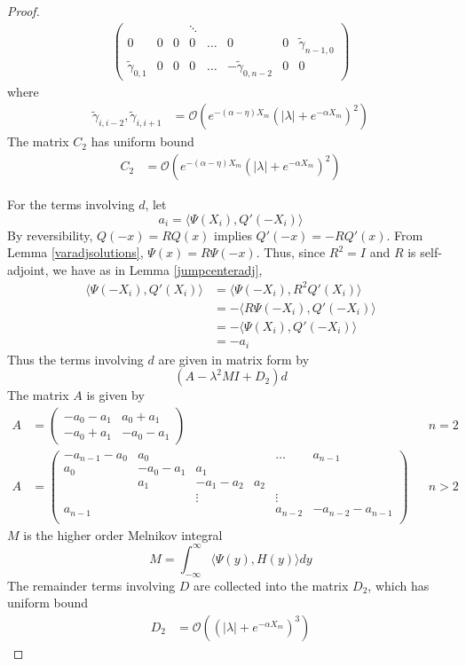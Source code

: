 \documentclass[thesis.tex]{subfiles}
\begin{document}
\begin{lemma}
\begin{proof}
\begin{align*}
\begin{pmatrix}
&  & & \ddots  \\
0 & 0 & 0 & 0 & \dots & 0 & 0 & \tilde{\gamma}_{n-1,0} \\
\tilde{\gamma}_{0,1} & 0 & 0 & 0 & \dots & -\tilde{\gamma}_{0, n-2} & 0 & 0 
\end{pmatrix}
\end{align*}
where
\begin{align*}
\tilde{\gamma}_{i,i-2}, \tilde{\gamma}_{i,i+1} &= \mathcal{O}(e^{-(\alpha - \eta) X_m}(|\lambda| + e^{-\alpha X_m})^2) 
\end{align*}
The matrix $C_2$ has uniform bound
\begin{align*}
C_2 &= \mathcal{O}(e^{-(\alpha - \eta) X_m}(|\lambda| + e^{-\alpha X_m})^2)
\end{align*}

For the terms involving $d$, let
\[
a_i = \langle \Psi(X_i), Q'(-X_i) \rangle 
\]
By reversibility, $Q(-x) = R Q(x)$ implies $Q'(-x) = -R Q'(x)$. From Lemma \ref{varadjsolutions}, $\Psi(x) = R \Psi(-x)$. Thus, since $R^2 = I$ and $R$ is self-adjoint, we have as in Lemma \ref{jumpcenteradj},
\begin{align*}
\langle \Psi(-X_i), Q'(X_i) \rangle &= \langle \Psi(-X_i), R^2 Q'(X_i) \rangle \\
&= -\langle R \Psi(-X_i), Q'(-X_i) \rangle \\
&= -\langle \Psi(X_i), Q'(-X_i) \rangle \\
&= -a_i
\end{align*}
Thus the terms involving $d$ are given in matrix form by
\[
(A - \lambda^2 M I + D_2)d
\]
The matrix $A$ is given by
\begin{align*}
A &= \begin{pmatrix}
-a_0 -a_1 & a_0 + a_1 \\
-a_0 + a_1 & -a_0 - a_1
\end{pmatrix} && n = 2 \\
A &= \begin{pmatrix}
-a_{n-1} - a_0 & a_0 & & & \dots & a_{n-1}\\
a_0 & -a_0 - a_1 &  a_1 \\
& a_1 & -a_1 - a_2 &  a_2 \\
& & \vdots & & \vdots \\
a_{n-1} & & & & a_{n-2} & -a_{n-2} - a_{n-1} \\
\end{pmatrix} && n > 2
\end{align*}
$M$ is the higher order Melnikov integral
\[
M = \int_{-\infty}^\infty \langle \Psi(y), H(y) \rangle dy
\]
The remainder terms involving $D$ are collected into the matrix $D_2$, which has uniform bound
\begin{align*}
D_2 &= \mathcal{O}((|\lambda| + e^{-\alpha X_m})^3)
\end{align*}
\end{proof}
\end{lemma}
\end{document}
